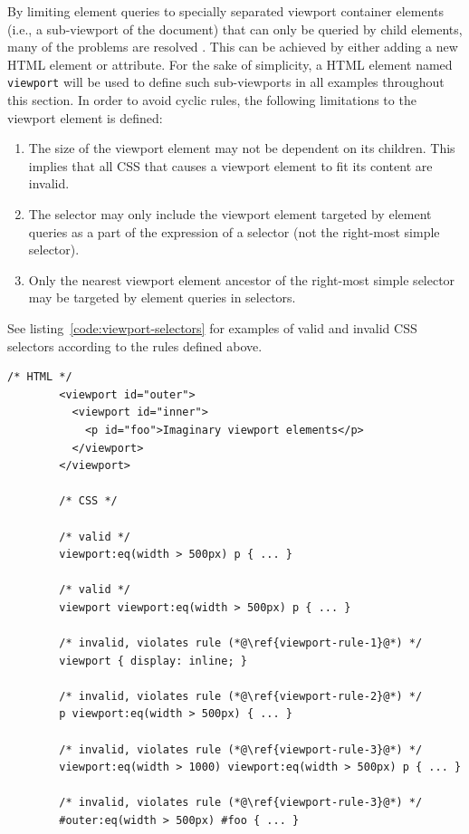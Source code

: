 \documentclass[a4paper,11pt]{kth-mag}
\newcommand{\code}[1]{\texttt{#1}}
\begin{document}
      By limiting element queries to specially separated \gls{viewport} container \glspl{element} (i.e., a sub-\gls{viewport} of the \gls{document}) that can only be queried by child \glspl{element}, many of the problems are resolved \cite{w3c_eq_mail,ricg_irc_log,ricg_issue_viewport}.
      This can be achieved by either adding a new \gls{HTML} element or attribute.
      For the sake of simplicity, a \gls{HTML} element named \code{viewport} will be used to define such sub-\glspl{viewport} in all examples throughout this section.
      In order to avoid cyclic rules, the following limitations to the \gls{viewport} element is defined:
      \begin{enumerate}
        \item\label{viewport-rule-1} The size of the \gls{viewport} element may not be dependent on its children. This implies that all \gls{CSS} that causes a \gls{viewport} \gls{element} to fit its content are invalid.
        \item\label{viewport-rule-2} The selector may only include the \gls{viewport} \gls{element} targeted by element queries as a part of the expression of a selector (not the right-most simple selector).
        \item\label{viewport-rule-3} Only the nearest \gls{viewport} element ancestor of the right-most simple selector may be targeted by element queries in selectors.
      \end{enumerate}
      See listing~\ref{code:viewport-selectors} for examples of valid and invalid CSS selectors according to the rules defined above.
      \begin{lstlisting}[gobble=8,caption={Examples of valid and invalid selectors with the \gls{viewport} \gls{element}.}, captionpos=b, label={code:viewport-selectors}]
        /* HTML */
        <viewport id="outer">
          <viewport id="inner">
            <p id="foo">Imaginary viewport elements</p>
          </viewport>
        </viewport>

        /* CSS */

        /* valid */
        viewport:eq(width > 500px) p { ... }

        /* valid */
        viewport viewport:eq(width > 500px) p { ... }

        /* invalid, violates rule (*@\ref{viewport-rule-1}@*) */
        viewport { display: inline; }

        /* invalid, violates rule (*@\ref{viewport-rule-2}@*) */
        p viewport:eq(width > 500px) { ... }

        /* invalid, violates rule (*@\ref{viewport-rule-3}@*) */
        viewport:eq(width > 1000) viewport:eq(width > 500px) p { ... }

        /* invalid, violates rule (*@\ref{viewport-rule-3}@*) */
        #outer:eq(width > 500px) #foo { ... }
      \end{lstlisting}
\end{document}
